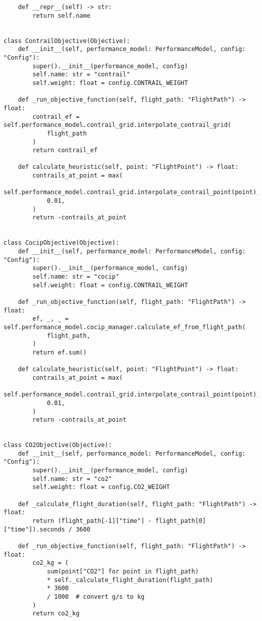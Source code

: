 \begin{verbatim}
    def __repr__(self) -> str:
        return self.name


class ContrailObjective(Objective):
    def __init__(self, performance_model: PerformanceModel, config: "Config"):
        super().__init__(performance_model, config)
        self.name: str = "contrail"
        self.weight: float = config.CONTRAIL_WEIGHT

    def _run_objective_function(self, flight_path: "FlightPath") -> float:
        contrail_ef = self.performance_model.contrail_grid.interpolate_contrail_grid(
            flight_path
        )
        return contrail_ef

    def calculate_heuristic(self, point: "FlightPoint") -> float:
        contrails_at_point = max(
            self.performance_model.contrail_grid.interpolate_contrail_point(point),
            0.01,
        )
        return -contrails_at_point


class CocipObjective(Objective):
    def __init__(self, performance_model: PerformanceModel, config: "Config"):
        super().__init__(performance_model, config)
        self.name: str = "cocip"
        self.weight: float = config.CONTRAIL_WEIGHT

    def _run_objective_function(self, flight_path: "FlightPath") -> float:
        ef, _, _ = self.performance_model.cocip_manager.calculate_ef_from_flight_path(
            flight_path,
        )
        return ef.sum()

    def calculate_heuristic(self, point: "FlightPoint") -> float:
        contrails_at_point = max(
            self.performance_model.contrail_grid.interpolate_contrail_point(point),
            0.01,
        )
        return -contrails_at_point


class CO2Objective(Objective):
    def __init__(self, performance_model: PerformanceModel, config: "Config"):
        super().__init__(performance_model, config)
        self.name: str = "co2"
        self.weight: float = config.CO2_WEIGHT

    def _calculate_flight_duration(self, flight_path: "FlightPath") -> float:
        return (flight_path[-1]["time"] - flight_path[0]["time"]).seconds / 3600

    def _run_objective_function(self, flight_path: "FlightPath") -> float:
        co2_kg = (
            sum(point["CO2"] for point in flight_path)
            * self._calculate_flight_duration(flight_path)
            * 3600
            / 1000  # convert g/s to kg
        )
        return co2_kg


\end{verbatim}
